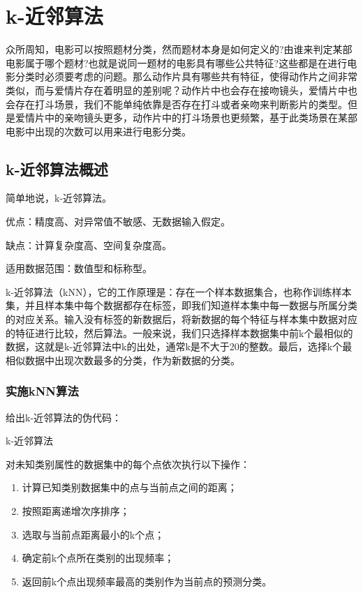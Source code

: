 \chapter{k-近邻算法}
众所周知，电影可以按照题材分类，然而题材本身是如何定义的?由谁来判定某部电影属于哪个题材?也就是说同一题材的电影具有哪些公共特征?这些都是在进行电影分类时必须要考虑的问题。那么动作片具有哪些共有特征，使得动作片之间非常类似，而与爱情片存在着明显的差别呢？动作片中也会存在接吻镜头，爱情片中也会存在打斗场景，我们不能单纯依靠是否存在打斗或者亲吻来判断影片的类型。但是爱情片中的亲吻镜头更多，动作片中的打斗场景也更频繁，基于此类场景在某部电影中出现的次数可以用来进行电影分类。

\section{k-近邻算法概述}
简单地说，k-近邻算法。

\begin{tcolorbox}[title=k-近邻算法]
    优点：精度高、对异常值不敏感、无数据输入假定。

    缺点：计算复杂度高、空间复杂度高。

    适用数据范围：数值型和标称型。
\end{tcolorbox}

k-近邻算法（kNN），它的工作原理是：存在一个样本数据集合，也称作训练样本集，并且样本集中每个数据都存在标签，即我们知道样本集中每一数据与所属分类的对应关系。输入没有标签的新数据后，将新数据的每个特征与样本集中数据对应的特征进行比较，然后算法。一般来说，我们只选择样本数据集中前k个最相似的数据，这就是k-近邻算法中k的出处，通常k是不大于20的整数。最后，选择k个最相似数据中出现次数最多的分类，作为新数据的分类。

\subsection{实施kNN算法}
给出k-近邻算法的伪代码：
\begin{algorithm}
    \caption{k-近邻算法}
    \label{kNN}
    对未知类别属性的数据集中的每个点依次执行以下操作：
    \begin{enumerate}
        \item 计算已知类别数据集中的点与当前点之间的距离；
        \item 按照距离递增次序排序；
        \item 选取与当前点距离最小的k个点；
        \item 确定前k个点所在类别的出现频率；
        \item 返回前k个点出现频率最高的类别作为当前点的预测分类。
    \end{enumerate}
\end{algorithm}

